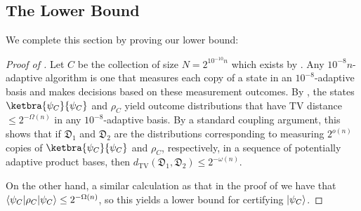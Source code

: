 \subsection{The Lower Bound}
We complete this section by proving our lower bound:
\begin{proof}[Proof of ]
    Let $C$ be the collection of size $N=2^{10^{-10}n}$ which exists by . Any $10^{-8}n$-adaptive algorithm is one that measures each copy of a state in an $10^{-8}$-adaptive basis and makes decisions based on these measurement outcomes. By , the states $\ketbra{\psi_C}{\psi_C}$ and $\rho_C$ yield outcome distributions that have TV distance $\leq 2^{-\Omega(n)}$ in any $10^{-8}$-adaptive basis. By a standard coupling argument, this shows that if $\mathfrak{D}_1$ and $\mathfrak{D}_2$ are the distributions corresponding to measuring $2^{o(n)}$ copies of $\ketbra{\psi_C}{\psi_C}$ and $\rho_C$, respectively, in a sequence of potentially adaptive product bases, then $d_{\mathrm{TV}}(\mathfrak{D}_1,\mathfrak{D}_2)\leq 2^{-\omega(n)}$.
    
    On the other hand, a similar calculation as that in the proof of  we have that $\langle\psi_C\rvert\rho_{C}\lvert\psi_C\rangle\leq 2^{-\Omega(n)}$, so this yields a lower bound for certifying $\lvert\psi_C\rangle$.
\end{proof}














